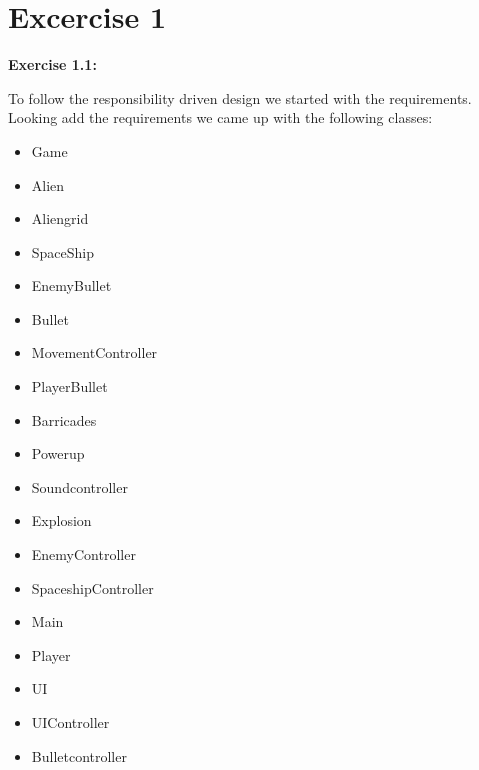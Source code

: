 \documentclass[10pt]{article}
\begin{document}
\section*{Excercise 1}

 \textbf{Exercise 1.1:}

To follow the responsibility driven design we started with the requirements.\\
Looking add the requirements we came up with the following classes:
\begin{itemize}
  \item Game
  \item Alien
  \item Aliengrid
  \item SpaceShip
  \item EnemyBullet
\item Bullet
\item MovementController
\item PlayerBullet
\item Barricades
\item Powerup
\item Soundcontroller
\item Explosion
\item EnemyController
\item SpaceshipController
\item Main
\item Player
\item UI
\item UIController
\item Bulletcontroller

\end{itemize}
\end{document}
